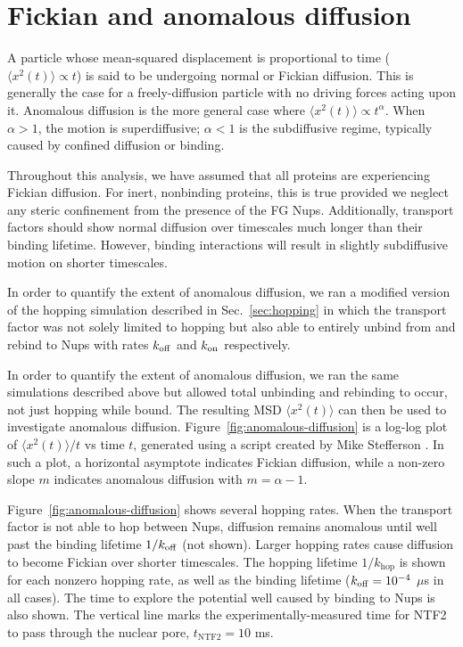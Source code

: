 \section{Fickian and anomalous diffusion}
\label{sec:fickian}
A particle whose mean-squared displacement is proportional to time ($\langle x^2(t) \rangle \propto t$) is said to be undergoing normal or Fickian diffusion.  This is generally the case for a freely-diffusion particle with no driving forces acting upon it.  Anomalous diffusion is the more general case where $\langle x^2(t)\rangle \propto t^\alpha$.  When $\alpha > 1$, the motion is superdiffusive; $\alpha < 1$ is the subdiffusive regime, typically caused by confined diffusion or binding.

Throughout this analysis, we have assumed that all proteins are experiencing Fickian diffusion.  For inert, nonbinding proteins, this is true provided we neglect any steric confinement from the presence of the FG Nups.  Additionally, transport factors should show normal diffusion over timescales much longer than their binding lifetime.  However, binding interactions will result in slightly subdiffusive motion on shorter timescales.

In order to quantify the extent of anomalous diffusion, we ran a modified version of the hopping simulation described in Sec.~\ref{sec:hopping} in which the transport factor was not solely limited to hopping but also able to entirely unbind from and rebind to Nups with rates $k_{\rm off}$ and $k_{\rm on}$ respectively.  

 In order to quantify the extent of anomalous diffusion, we ran the same simulations described above but allowed total unbinding and rebinding to occur, not just hopping while bound.  The resulting MSD $\langle x^2(t) \rangle$ can then be used to investigate anomalous diffusion.  Figure~\ref{fig:anomalous-diffusion} is a log-log plot of $\langle x^2(t) \rangle/t$ vs time $t$, generated using a script created by Mike Stefferson \cite{stefferson18}.  In such a plot, a horizontal asymptote indicates Fickian diffusion, while a non-zero slope $m$ indicates anomalous diffusion with $m = \alpha -1$.

Figure~\ref{fig:anomalous-diffusion} shows several hopping rates.  When the transport factor is not able to hop between Nups, diffusion remains anomalous until well past the binding lifetime $1/k_{\rm off}$ (not shown).  Larger hopping rates cause diffusion to become Fickian over shorter timescales.  The hopping lifetime $1/k_\mathrm{hop}$ is shown for each nonzero hopping rate, as well as the binding lifetime ($k_{\rm off} = 10^{-4}$ $\mu$s in all cases).  The time to explore the potential well caused by binding to Nups is also shown.  The vertical line marks the experimentally-measured time for NTF2 to pass through the nuclear pore, $t_\mathrm{NTF2} = 10$ ms.

